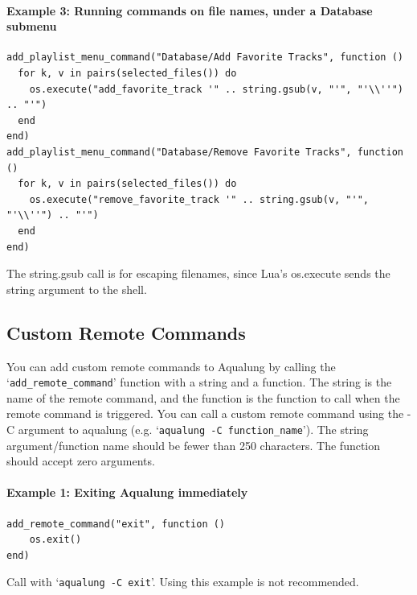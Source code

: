 \documentclass[10pt,english]{article}
\begin{document}
\paragraph*{Example 3: Running commands on file names, under a Database submenu}

\begin{verbatim}
add_playlist_menu_command("Database/Add Favorite Tracks", function ()
  for k, v in pairs(selected_files()) do
    os.execute("add_favorite_track '" .. string.gsub(v, "'", "'\\''") .. "'")
  end
end)
add_playlist_menu_command("Database/Remove Favorite Tracks", function ()
  for k, v in pairs(selected_files()) do
    os.execute("remove_favorite_track '" .. string.gsub(v, "'", "'\\''") .. "'")
  end
end)
\end{verbatim}



\noindent The string.gsub call is for escaping filenames, since Lua's os.execute sends the
string argument to the shell.






\subsection{Custom Remote Commands\label{idp2022240}}



\noindent You can add custom remote commands to Aqualung by
calling the `\texttt{add\_remote\_command}'
function with a string and a function.  The string is the
name of the remote command, and the function is the
function to call when the remote command is triggered.
You can call a custom remote command using the -C argument to
aqualung (e.g. `\texttt{aqualung -C function\_name}').
The string argument/function name should be fewer than
250 characters.  The function should accept zero arguments.


\paragraph*{Example 1: Exiting Aqualung immediately}

\begin{verbatim}
add_remote_command("exit", function ()
    os.exit()
end)
\end{verbatim}



\noindent Call with `\texttt{aqualung -C exit}'.  Using this example is not recommended.
\end{document}
